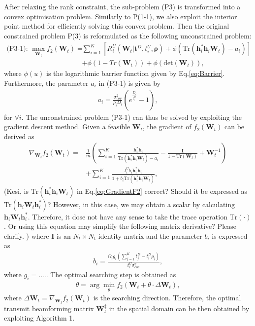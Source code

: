 \documentclass[12pt,draft,onecolumn,journal]{IEEEtran}
\begin{document}
After relaxing the rank constraint, the sub-problem (P3) is transformed into a convex optimisation problem. Similarly to P(1-1), we also exploit the interior point method for efficiently solving this convex problem. Then the original constrained problem P(3) is reformulated as the following unconstrained problem:
\begin{align}
	\text{(P3-1): } \max_{\mathbf{W}_t} f_2(\mathbf{W}_t) = &\sum_{i=1}^{K} \left[R_{i}^U (\mathbf{W}_t | \mathbf{t}^D, t_i^U, \boldsymbol{\rho}) + \phi(\text{Tr}(\mathbf{h}_i^*\mathbf{h}_i\mathbf{W}_t)-a_i)\right] \nonumber \\
	& + \phi(1-Tr(\mathbf{W}_t)) + \phi(\text{det}(\mathbf{W}_t)), \label{eq:P3-1}
\end{align}
where $\phi(u)$ is the logarithmic barrier function given by Eq.\eqref{eq:Barrier}. Furthermore, the parameter $a_i$ in (P3-1) is given by
\begin{align}
	a_i = \frac{\sigma_{cov}^2}{\rho_i \Omega_i}(e^{\frac{D_i}{t^D_i}} - 1),
\end{align}
for $\forall i$. The unconstrained problem (P3-1) can thus be solved by exploiting the gradient descent method. Given a feasible $\mathbf{W}_t$, the gradient of $f_2(\mathbf{W}_t)$ can be derived as
\begin{align}
	\nabla_{\mathbf{W}_t}f_2(\mathbf{W}_t) = & \frac{1}{m}\left(\sum_{i=1}^{K}\frac{\mathbf{h}_i^*\mathbf{h}_i}{\text{Tr}(\mathbf{h}_i^*\mathbf{h}_i\mathbf{W}_t) - a_i} - \frac{\mathbf{I}}{1 - \mathrm{Tr}(\mathbf{W}_t)} + \mathbf{W}_t^{-1}\right) \nonumber \\
	& + \sum_{i=1}^K\frac{t_i^Ub_i \mathbf{h}_i^*\mathbf{h}_i}{1 +  b_i\text{Tr}(\mathbf{h}_i^*\mathbf{h}_i\mathbf{W}_t)}, \label{eq:GradientF2}
\end{align}
{\color{red} (Kesi, is $\text{Tr}(\mathbf{h}_i^*\mathbf{h}_i\mathbf{W}_t)$ in Eq.\eqref{eq:GradientF2} correct? Should it be expressed as $\text{Tr}(\mathbf{h}_i\mathbf{W}_t\mathbf{h}_i^*)$? However, in this case, we may obtain a scalar by calculating $\mathbf{h}_i\mathbf{W}_t\mathbf{h}_i^*$. Therefore, it dose not have any sense to take the trace operation $\text{Tr}(\cdot)$. Or using this equation may simplify the following matrix derivative? Please clarify. )} where $\mathbf{I}$ is an $N_t\times N_t$ identity matrix and the parameter $b_i$ is expressed as
\begin{align}
	b_i = \frac{\Omega_ig_i(\sum_{j=1}^{K}t_j^D - t_i^D\rho_i)}{t_i^U\sigma_{cov}^2}, \label{eq:Bi}
\end{align}
where $g_i = ....$. The optimal searching step is obtained as
\begin{align}
	\theta = \arg \min_{\theta} f_2(\mathbf{W}_t + \theta\cdot \Delta \mathbf{W}_t), \label{eq:SearchStepF2}
\end{align}
where $\Delta \mathbf{W}_t = \nabla_{\mathbf{W}_t}f_2(\mathbf{W}_t)$ is the searching direction. Therefore, the optimal transmit beamforming matrix $\mathbf{W}_{t}^{\ddagger}$ in the spatial domain can be then obtained by exploiting Algorithm 1. \cbstart \cbend
\end{document}
